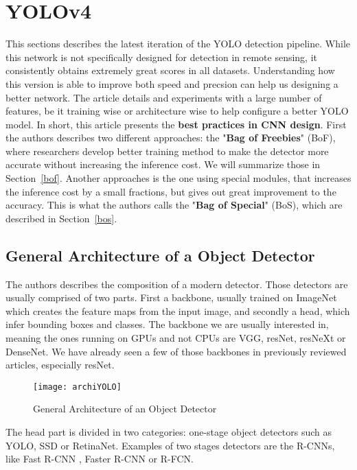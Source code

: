 \section{YOLOv4}
This sections describes the latest iteration of the YOLO detection pipeline. While this network is not specifically designed for detection in remote sensing, it consistently obtains extremely great scores in all datasets. Understanding how this version is able to improve both speed and precsion can help us designing a better network. The article details and experiments with a large number of features, be it training wise or architecture wise to help configure a better YOLO model. In short, this article presents the \textbf{best practices in CNN design}. First the authors describes two different approaches: the "\textbf{Bag of Freebies}" (BoF), where researchers develop better training method to make the detector more accurate without increasing the inference cost. We will summarize those in Section~\ref{bof}. Another approaches is the one using special modules, that increases the inference cost by a small fractions, but gives out great improvement to the accuracy. This is what the authors calls the "\textbf{Bag of Special}" (BoS), which are described in Section~\ref{bos}. 


\subsection{General Architecture of a Object Detector}
The authors describes the composition of a modern detector. Those detectors are usually comprised of two parts. First a backbone, usually trained on ImageNet\cite{imageNet} which creates the feature maps from the input image, and secondly a head, which infer bounding boxes and classes. The backbone we are usually interested in, meaning the ones running on GPUs and not CPUs are VGG\cite{vgg}, resNet\cite{resNet}, resNeXt\cite{resNeXt} or DenseNet\cite{denseNet}. We have already seen a few of those backbones in previously reviewed articles, especially resNet.

\begin{figure}[h]
  \centering
  \texttt{[image: archiYOLO]}
	\caption{General Architecture of an Object Detector}
  \label{fig:genArchi}
\end{figure}
The head part is divided in two categories: one-stage object detectors such as YOLO\cite{yolov9000, yolov3}, SSD\cite{ssd} or RetinaNet\cite{retinaNet}. Examples of two stages detectors are the R-CNNs\cite{rcnn}, like Fast R-CNN \cite{fastRCNN}, Faster R-CNN\cite{FasterRCNN} or R-FCN\cite{rfcn}.

